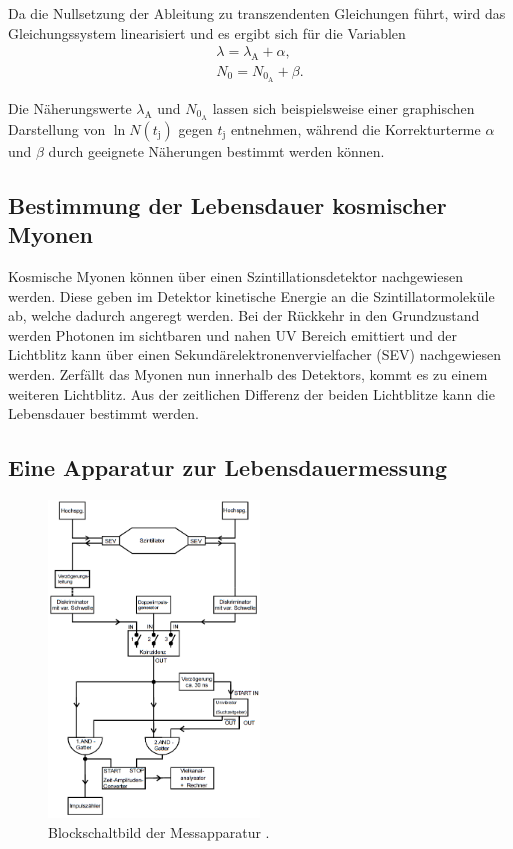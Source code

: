 Da die Nullsetzung der Ableitung zu transzendenten Gleichungen führt, wird das Gleichungssystem linearisiert und es ergibt sich für die Variablen
\begin{eqnarray}
	\lambda = \lambda_\text{A} + \alpha ,\\
	N_\text{0} = N_{\text{0}_\text{A}} + \beta.
\end{eqnarray}

Die Näherungswerte $\lambda_\text{A}$ und $N_{\text{0}_\text{A}}$ lassen sich beispielsweise einer graphischen Darstellung von $\ln{N(t_\text{j})}$ gegen $t_\text{j}$ entnehmen, während die Korrekturterme $\alpha$ und $\beta$ durch geeignete Näherungen bestimmt werden können.
\FloatBarrier
\subsection{Bestimmung der Lebensdauer kosmischer Myonen} %
\label{sub:bestimmung_der_lebensdauer_kosmischer_myonen}

Kosmische Myonen können über einen Szintillationsdetektor nachgewiesen werden.
Diese geben im Detektor kinetische Energie an die Szintillatormoleküle ab, welche dadurch angeregt werden.
Bei der Rückkehr in den Grundzustand werden Photonen im sichtbaren und nahen UV Bereich emittiert und der Lichtblitz kann über einen Sekundärelektronenvervielfacher (SEV) nachgewiesen werden.
Zerfällt das Myonen nun innerhalb des Detektors, kommt es zu einem weiteren Lichtblitz.
Aus der zeitlichen Differenz der beiden Lichtblitze kann die Lebensdauer bestimmt werden.
\FloatBarrier
\subsection{Eine Apparatur zur Lebensdauermessung} %
\label{sub:eine_apparatur_zur_lebensdauermessung}

\begin{figure}
	\centering
	\includegraphics[width = 0.5\textwidth]{pic/schaltung.png}
	\caption{Blockschaltbild der Messapparatur \cite{anleitung}.}
	\label{schaltung}
\end{figure}

